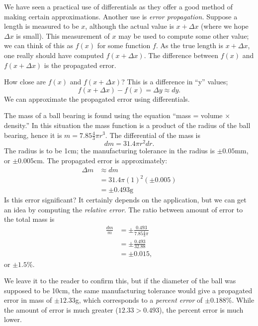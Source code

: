 We have seen a practical use of differentials as they offer a good method of making certain approximations. Another use is \textit{error propagation.} Suppose a length is measured to be $x$, although the actual value is $x+\Delta x$ (where we hope $\Delta x$ is small). This measurement of $x$ may be used to compute some other value; we can think of this as $f(x)$ for some function $f$. As the true length is $x+\Delta x$, one really should have computed $f(x+\Delta x)$. The difference between $f(x)$ and $f(x+\Delta x)$ is the propagated error. 

How close are $f(x)$ and $f(x+\Delta x)$? This is a difference in ``y'' values;
\[f(x+\Delta x)-f(x) = \Delta y \approx dy.\]
We can approximate the propagated error using differentials.

{The mass of a ball bearing is found using the equation ``mass = volume $\times$ density.'' In this situation the mass function is a product of the radius of the ball bearing, hence it is $m = 7.85\frac43\pi r^3$. The differential of the mass is
\[dm = 31.4\pi r^2 dr.\]
The radius is to be 1cm; the manufacturing tolerance in the radius is $\pm 0.05$mm, or $\pm 0.005$cm. The propagated error is approximately:
\begin{align*}
\Delta m & \approx dm \\
				&= 31.4\pi (1)^2 (\pm 0.005) \\
				&= \pm 0.493\text{g}
\end{align*}
Is this error significant? It certainly depends on the application, but we can get an idea by computing the \textit{relative error}. The ratio between amount of error to the total mass is
\begin{align*}
\frac{dm}{m} &= \pm \frac{0.493}{7.85\frac43\pi} \\
							&=\pm \frac{0.493}{32.88}\\
							&=\pm 0.015,
\end{align*}
or $\pm 1.5$\%. 


We leave it to the reader to confirm this, but if the diameter of the ball was supposed to be 10cm, the same manufacturing tolerance would give a propagated error in mass of $\pm12.33$g, which corresponds to a \textit{percent error} of $\pm0.188$\%. While the amount of error is much greater ($12.33 > 0.493$), the percent error is much lower.}


